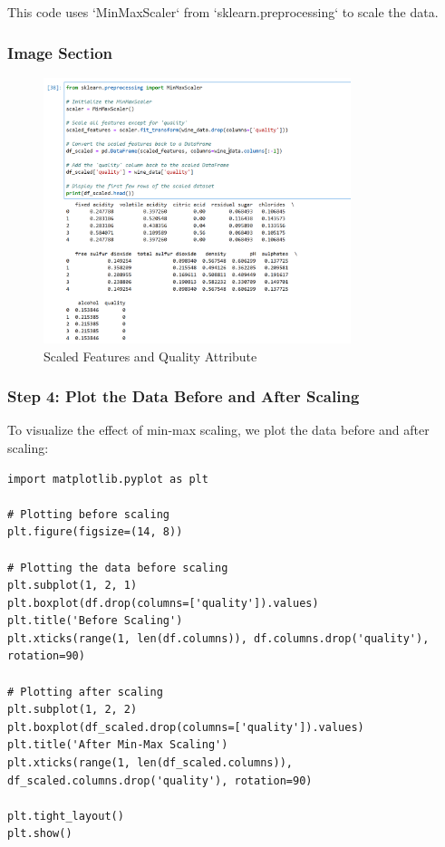 \documentclass{exam}
\begin{document}
This code uses `MinMaxScaler` from `sklearn.preprocessing` to scale the data.

\subsubsection*{Image Section}

\begin{figure}[h!]
    \centering
    \includegraphics[width=0.8\textwidth]{images/wine_scaled_data.png}
    \caption{Scaled Features and Quality Attribute}
    \label{fig:step_3_scaled_data}
\end{figure}

\newpage

\subsubsection{Step 4: Plot the Data Before and After Scaling}

To visualize the effect of min-max scaling, we plot the data before and after scaling:

\begin{verbatim}
import matplotlib.pyplot as plt

# Plotting before scaling
plt.figure(figsize=(14, 8))

# Plotting the data before scaling
plt.subplot(1, 2, 1)
plt.boxplot(df.drop(columns=['quality']).values)
plt.title('Before Scaling')
plt.xticks(range(1, len(df.columns)), df.columns.drop('quality'), rotation=90)

# Plotting after scaling
plt.subplot(1, 2, 2)
plt.boxplot(df_scaled.drop(columns=['quality']).values)
plt.title('After Min-Max Scaling')
plt.xticks(range(1, len(df_scaled.columns)), df_scaled.columns.drop('quality'), rotation=90)

plt.tight_layout()
plt.show()
\end{verbatim}
\end{document}
